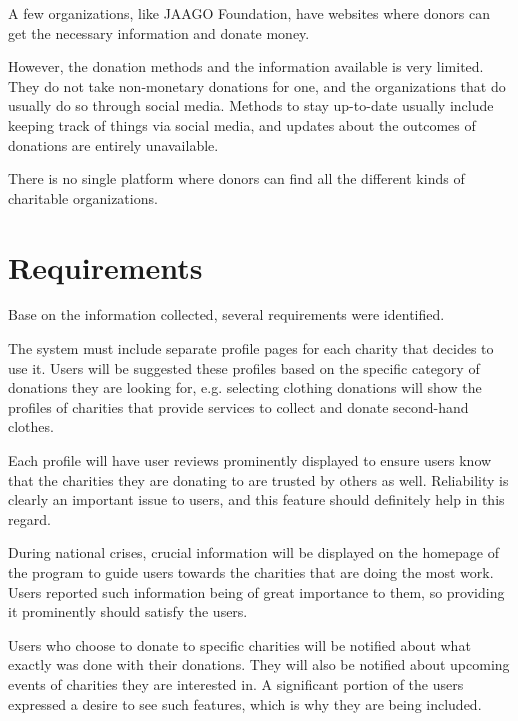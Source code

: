 \documentclass{scrreprt}
\begin{document}
    A few organizations, like JAAGO Foundation, have websites where donors can get the necessary information and donate money.\par
    
    However, the donation methods and the information available is very limited. They do not take non-monetary donations for one, and the organizations that do usually do so through social media. Methods to stay up-to-date usually include keeping track of things via social media, and updates about the outcomes of donations are entirely unavailable.\par
    
    There is no single platform where donors can find all the different kinds of charitable organizations.
    
    \section{Requirements}
    
    Base on the information collected, several requirements were identified.\par
    
    The system must include separate profile pages for each charity that decides to use it. Users will be suggested these profiles based on the specific category of donations they are looking for, e.g. selecting clothing donations will show the profiles of charities that provide services to collect and donate second-hand clothes.\par
    
    Each profile will have user reviews prominently displayed to ensure users know that the charities they are donating to are trusted by others as well. Reliability is clearly an important issue to users, and this feature should definitely help in this regard.\par
    
    During national crises, crucial information will be displayed on the homepage of the program to guide users towards the charities that are doing the most work. Users reported such information being of great importance to them, so providing it prominently should satisfy the users.\par
    
    Users who choose to donate to specific charities will be notified about what exactly was done with their donations. They will also be notified about upcoming events of charities they are interested in. A significant portion of the users expressed a desire to see such features, which is why they are being included.\par
    
\end{document}
